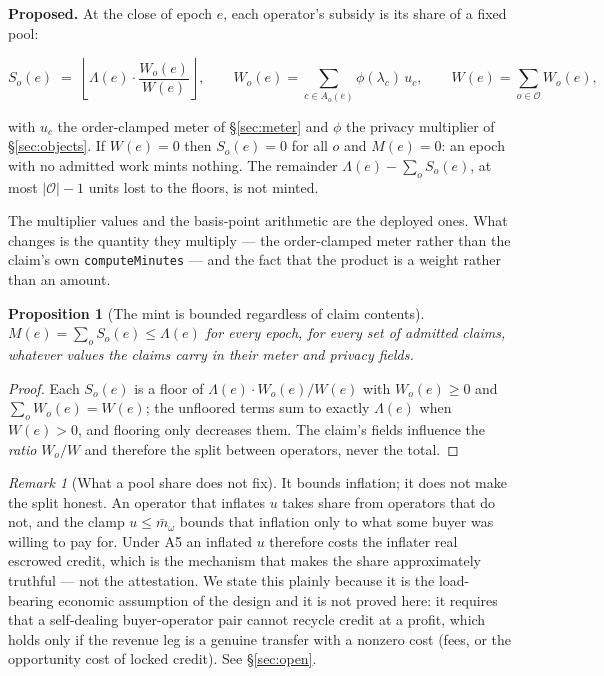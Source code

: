 \documentclass[11pt,a4paper]{article}
\newtheorem{proposition}[theorem]{Proposition}
\theoremstyle{definition}
\theoremstyle{remark}
\newtheorem{remark}{Remark}[section]
\newcommand{\code}[1]{\texttt{#1}}
\newcommand{\Ord}{\omega}
\newcommand{\Claim}{c}
\newcommand{\Ops}{\mathcal{O}}
\begin{document}
\textbf{Proposed.} At the close of epoch $e$, each operator's subsidy is its
share of a fixed pool:

\[
S_o(e) \;=\; \left\lfloor \Lambda(e) \cdot \frac{W_o(e)}{W(e)} \right\rfloor,
\qquad
W_o(e) = \sum_{\Claim \in A_o(e)} \phi(\lambda_\Claim)\, u_\Claim,
\qquad
W(e) = \sum_{o \in \Ops} W_o(e),
\]

with $u_\Claim$ the order-clamped meter of \S\ref{sec:meter} and $\phi$ the
privacy multiplier of \S\ref{sec:objects}. If $W(e) = 0$ then $S_o(e) = 0$ for
all $o$ and $M(e) = 0$: an epoch with no admitted work mints nothing. The
remainder $\Lambda(e) - \sum_o S_o(e)$, at most $|\Ops| - 1$ units lost to the
floors, is not minted.

The multiplier values and the basis-point arithmetic are the deployed ones. What
changes is the quantity they multiply --- the order-clamped meter rather than
the claim's own \code{computeMinutes} --- and the fact that the product is a
weight rather than an amount.

\begin{proposition}[The mint is bounded regardless of claim contents]
$M(e) = \sum_o S_o(e) \le \Lambda(e)$ for every epoch, for every set of
admitted claims, whatever values the claims carry in their meter and privacy
fields.
\end{proposition}
\begin{proof}
Each $S_o(e)$ is a floor of $\Lambda(e) \cdot W_o(e)/W(e)$ with
$W_o(e) \ge 0$ and $\sum_o W_o(e) = W(e)$; the unfloored terms sum to exactly
$\Lambda(e)$ when $W(e) > 0$, and flooring only decreases them. The claim's
fields influence the \emph{ratio} $W_o/W$ and therefore the split between
operators, never the total.
\end{proof}

\begin{remark}[What a pool share does not fix]
It bounds inflation; it does not make the split honest. An operator that
inflates $u$ takes share from operators that do not, and the clamp
$u \le \bar m_\Ord$ bounds that inflation only to what some buyer was willing to
pay for. Under A5 an inflated $u$ therefore costs the inflater real escrowed
credit, which is the mechanism that makes the share approximately truthful ---
not the attestation. We state this plainly because it is the load-bearing
economic assumption of the design and it is not proved here: it requires that
a self-dealing buyer-operator pair cannot recycle credit at a profit, which
holds only if the revenue leg is a genuine transfer with a nonzero cost
(fees, or the opportunity cost of locked credit). See \S\ref{sec:open}.
\end{remark}
\end{document}
